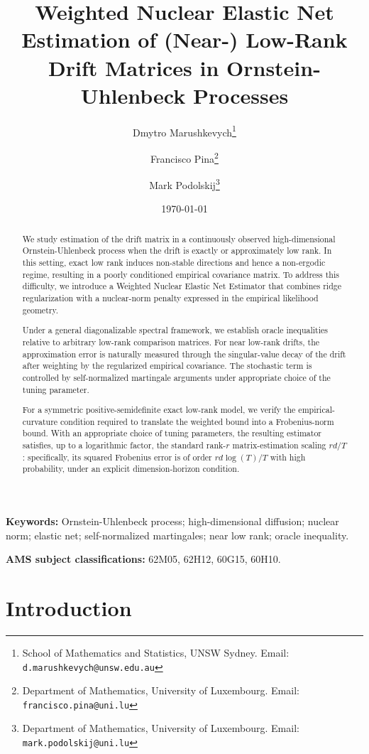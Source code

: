 \documentclass[11pt]{article}
\title{Weighted Nuclear Elastic Net Estimation of (Near-) Low-Rank Drift Matrices in Ornstein-Uhlenbeck Processes}
\author{Dmytro Marushkevych\thanks{School of Mathematics and Statistics, UNSW Sydney. Email: \texttt{d.marushkevych@unsw.edu.au}} \and Francisco Pina\thanks{Department of Mathematics, University of Luxembourg. Email: \texttt{francisco.pina@uni.lu}} \and Mark Podolskij\thanks{Department of Mathematics, University of Luxembourg. Email: \texttt{mark.podolskij@uni.lu}}}
\date{\today}
\begin{document}
\maketitle

\begin{abstract}
We study estimation of the drift matrix in a continuously observed
high-dimensional Ornstein-Uhlenbeck process when the drift is exactly or
approximately low rank. In this setting, exact low rank induces non-stable directions and hence a non-ergodic regime, resulting in a poorly conditioned empirical covariance matrix. To address this difficulty, we introduce a Weighted
Nuclear Elastic Net Estimator that combines ridge regularization with a
nuclear-norm penalty expressed in the empirical likelihood geometry.

Under a general diagonalizable spectral framework, we establish
 oracle inequalities relative to arbitrary low-rank comparison
matrices. For near low-rank drifts, the approximation error is
naturally measured through the singular-value decay of the drift after
weighting by the regularized empirical covariance. The stochastic term is
controlled by self-normalized martingale arguments under appropriate choice of the tuning parameter. 

For a symmetric positive-semidefinite exact low-rank model, we verify the empirical-curvature condition required to
translate the weighted bound into a Frobenius-norm bound. With an appropriate
choice of tuning parameters, the resulting estimator satisfies, up to a
logarithmic factor, the standard rank-$r$ matrix-estimation scaling
$r d/T$: specifically, its squared Frobenius error is of order
$r d\log(T)/T$ with high probability, under an explicit
dimension-horizon condition.
\end{abstract}

\noindent\textbf{Keywords:} Ornstein-Uhlenbeck process; high-dimensional diffusion; nuclear norm; elastic net; self-normalized martingales; near low rank; oracle inequality.

\medskip
\noindent\textbf{AMS subject classifications:} 62M05, 62H12, 60G15, 60H10.

\tableofcontents



\section{Introduction}\label{sec:introduction}
\end{document}
